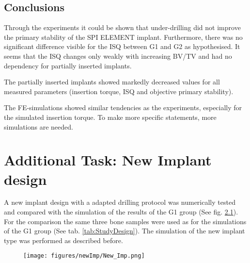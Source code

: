 \documentclass[12pt, a4paper, twoside]{report}
\begin{document}
\section{Conclusions}
%
Through the experiments it could be shown that under-drilling did not improve the primary stability of the SPI ELEMENT implant. Furthermore, there was no significant difference visible for the ISQ between G1 and G2 as hypothesised. It seems that the ISQ changes only weakly with increasing BV/TV and had no dependency for partially inserted implants.

The partially inserted implants showed markedly decreased values for all measured parameters (insertion torque, ISQ and objective primary stability).

The FE-simulations showed similar tendencies as the experiments, especially for the simulated insertion torque. To make more specific statements, more simulations are needed.



\newpage
%
\chapter{Additional Task: New Implant design}
%
A new implant design with a adapted drilling protocol was numerically tested and compared with the simulation of the results of the G1 group (See fig. \ref{fig:New_Imp}). For the comparison the same three bone samples were used as for the simulations of the G1 group (See tab. \ref{tab:StudyDesign}). The simulation of the new implant type was performed as described before.
%
\begin{figure}[H]
\centering 
\label{sublable2}\texttt{[image: figures/newImp/New\_Imp.png]}
\label{fig:New_Imp}
\end{figure}
%
\end{document}
